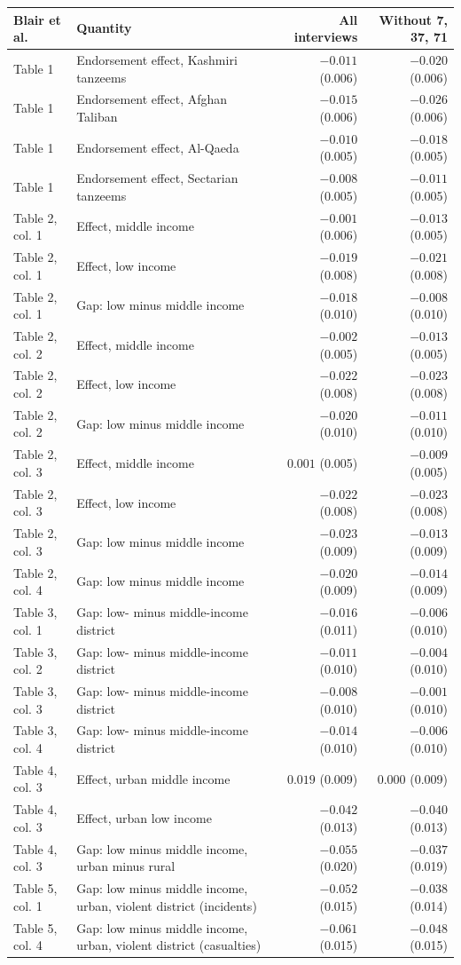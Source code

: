 \begin{tabular}{llrr}
\toprule
Blair et al. & Quantity & All interviews & Without 7, 37, 71 \\
\midrule
Table 1 & Endorsement effect, Kashmiri tanzeems & $-0.011$ (0.006) & $-0.020$ (0.006) \\
Table 1 & Endorsement effect, Afghan Taliban & $-0.015$ (0.006) & $-0.026$ (0.006) \\
Table 1 & Endorsement effect, Al-Qaeda & $-0.010$ (0.005) & $-0.018$ (0.005) \\
Table 1 & Endorsement effect, Sectarian tanzeems & $-0.008$ (0.005) & $-0.011$ (0.005) \\
\addlinespace
Table 2, col. 1 & Effect, middle income & $-0.001$ (0.006) & $-0.013$ (0.005) \\
Table 2, col. 1 & Effect, low income & $-0.019$ (0.008) & $-0.021$ (0.008) \\
Table 2, col. 1 & Gap: low minus middle income & $-0.018$ (0.010) & $-0.008$ (0.010) \\
Table 2, col. 2 & Effect, middle income & $-0.002$ (0.005) & $-0.013$ (0.005) \\
Table 2, col. 2 & Effect, low income & $-0.022$ (0.008) & $-0.023$ (0.008) \\
Table 2, col. 2 & Gap: low minus middle income & $-0.020$ (0.010) & $-0.011$ (0.010) \\
Table 2, col. 3 & Effect, middle income & $0.001$ (0.005) & $-0.009$ (0.005) \\
Table 2, col. 3 & Effect, low income & $-0.022$ (0.008) & $-0.023$ (0.008) \\
Table 2, col. 3 & Gap: low minus middle income & $-0.023$ (0.009) & $-0.013$ (0.009) \\
Table 2, col. 4 & Gap: low minus middle income & $-0.020$ (0.009) & $-0.014$ (0.009) \\
\addlinespace
Table 3, col. 1 & Gap: low- minus middle-income district & $-0.016$ (0.011) & $-0.006$ (0.010) \\
Table 3, col. 2 & Gap: low- minus middle-income district & $-0.011$ (0.010) & $-0.004$ (0.010) \\
Table 3, col. 3 & Gap: low- minus middle-income district & $-0.008$ (0.010) & $-0.001$ (0.010) \\
Table 3, col. 4 & Gap: low- minus middle-income district & $-0.014$ (0.010) & $-0.006$ (0.010) \\
\addlinespace
Table 4, col. 3 & Effect, urban middle income & $0.019$ (0.009) & $0.000$ (0.009) \\
Table 4, col. 3 & Effect, urban low income & $-0.042$ (0.013) & $-0.040$ (0.013) \\
Table 4, col. 3 & Gap: low minus middle income, urban minus rural & $-0.055$ (0.020) & $-0.037$ (0.019) \\
\addlinespace
Table 5, col. 1 & Gap: low minus middle income, urban, violent district (incidents) & $-0.052$ (0.015) & $-0.038$ (0.014) \\
Table 5, col. 4 & Gap: low minus middle income, urban, violent district (casualties) & $-0.061$ (0.015) & $-0.048$ (0.015) \\
\bottomrule
\end{tabular}
